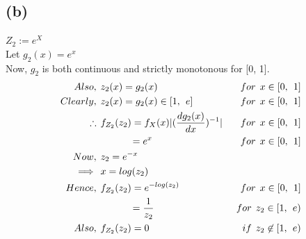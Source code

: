 \documentclass[a4paper,fleqn,11pt]{article}
\theoremstyle{mytheor}
\begin{document}
\subsection*{(b)}
$Z_{2} := e^X$ \\
Let $g_{2}(x) = e^x$ \\
Now, $g_{2}$ is both continuous and strictly monotonous for [0, 1].
\begin{align*}
Also, \hspace{1ex} & z_{2}(x) = g_{2}(x) \hspace{1ex} & for \hspace{1ex} x \in [0, \hspace{1ex} 1] \\
Clearly, \hspace{1ex} & z_{2}(x) = g_{2}(x) \in [1, \hspace{1ex} e] \hspace{1ex} & for \hspace{1ex} x \in [0, \hspace{1ex} 1] \\
\therefore \hspace{1ex} & f_{Z_{2}}(z_{2}) = f_{X} (x) |(\frac{dg_{2} (x)}{dx})^{-1}| \hspace{1ex} & for \hspace{1ex} x \in [0, \hspace{1ex} 1] \\
& \hspace{7ex} = e^x \hspace{1ex} & for \hspace{1ex} x \in [0, \hspace{1ex} 1] \\
Now, \hspace{1ex} & z_{2} = e^{-x} \\
\implies \hspace{1ex} & x = log (z_{2}) \\
Hence, \hspace{1ex} & f_{Z_{2}}(z_{2}) = e^{-log (z_{2})} \hspace{1ex} & for \hspace{1ex} x \in [0, \hspace{1ex} 1]  \\
& \hspace{7ex} = \frac{1}{z_{2}} \hspace{1ex} & for \hspace{1ex} z_{2} \in [1, \hspace{1ex} e) \\
Also, \hspace{1ex} & f_{Z_{2}}(z_{2}) = 0 \hspace{1ex} & if \hspace{1ex} z_2 \not\in [1, \hspace{1ex} e)
\end{align*}
\end{document}
